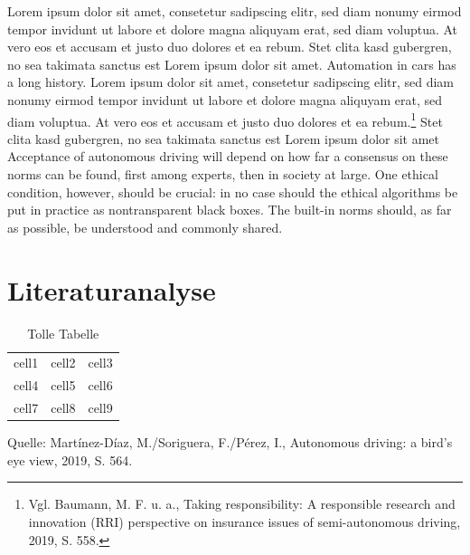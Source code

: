 Lorem ipsum dolor sit amet, consetetur sadipscing elitr, sed diam nonumy eirmod tempor invidunt ut labore et dolore magna aliquyam erat, sed diam voluptua.
At vero eos et accusam et justo duo dolores et ea rebum.
Stet clita kasd gubergren, no sea takimata sanctus est Lorem ipsum dolor sit amet.
Automation in cars has a long history.  Lorem ipsum dolor sit amet, consetetur sadipscing elitr, sed diam nonumy eirmod tempor invidunt ut labore et dolore magna aliquyam erat, sed diam voluptua.
At vero eos et accusam et justo duo dolores et ea rebum.\footnote{Vgl. Baumann, M. F. u. a., Taking responsibility: A responsible research and innovation (RRI) perspective on insurance issues of semi-autonomous driving, 2019, S. 558.}
Stet clita kasd gubergren, no sea takimata sanctus est Lorem ipsum dolor sit amet Acceptance of autonomous driving will depend on how far a consensus on these norms can be found, first among experts, then in society at large.
One ethical condition, however, should be crucial: in no case should the ethical algorithms be put in practice as nontransparent black boxes.
The built-in norms should, as far as possible, be understood and commonly shared.


\section{Literaturanalyse}

\begin{table}[h]
	\caption{Tolle Tabelle}
	\centering
	\begin{tabular}{ | c | c | c | }
		\hline
		cell1 & cell2 & cell3 \\
		cell4 & cell5 & cell6 \\
		cell7 & cell8 & cell9 \\
		\hline
	\end{tabular}
	\begin{flushleft}
		Quelle: Martínez-Díaz, M./Soriguera, F./Pérez, I., Autonomous driving: a bird's eye view, 2019, S. 564.
	\end{flushleft}
\end{table}

